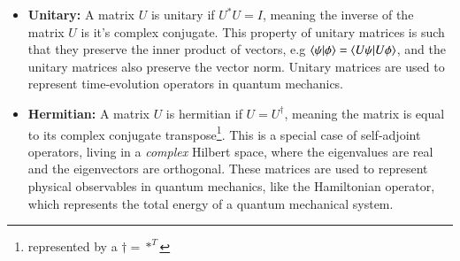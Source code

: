 \documentclass{subfiles}
\begin{document}
\begin{itemize}
    \item \textbf{Unitary:} A matrix $U$ is unitary if $U^*U = I$, meaning the inverse of the matrix $U$ is it's complex conjugate. This property of unitary matrices is such that they preserve the inner product of vectors, e.g $\braket{\psi|\phi} = \braket{U\psi|U\phi}$, and the unitary matrices also preserve the vector norm. Unitary matrices are used to represent time-evolution operators in quantum mechanics.
    \item \textbf{Hermitian:} A matrix $U$ is hermitian if $U = U^\dagger$, meaning the matrix is equal to its complex conjugate transpose\footnote{represented by a $\dagger = *^T$}. This is a special case of self-adjoint operators, living in a \emph{complex} Hilbert space, where the eigenvalues are real and the eigenvectors are orthogonal. These matrices are used to represent physical observables in quantum mechanics, like the Hamiltonian operator, which represents the total energy of a quantum mechanical system.
\end{itemize}
\end{document}

